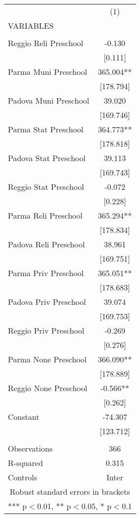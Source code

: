 \begin{tabular}{lc} \hline
 & (1) \\
VARIABLES &  \\ \hline
 &  \\
Reggio Reli Preschool & -0.130 \\
 & [0.111] \\
Parma Muni Preschool & 365.004** \\
 & [178.794] \\
Padova Muni Preschool & 39.020 \\
 & [169.746] \\
Parma Stat Preschool & 364.773** \\
 & [178.818] \\
Padova Stat Preschool & 39.113 \\
 & [169.743] \\
Reggio Stat Preschool & -0.072 \\
 & [0.228] \\
Parma Reli Preschool & 365.294** \\
 & [178.834] \\
Padova Reli Preschool & 38.961 \\
 & [169.751] \\
Parma Priv Preschool & 365.051** \\
 & [178.683] \\
Padova Priv Preschool & 39.074 \\
 & [169.753] \\
Reggio Priv Preschool & -0.269 \\
 & [0.276] \\
Parma None Preschool & 366.090** \\
 & [178.889] \\
Reggio None Preschool & -0.566** \\
 & [0.262] \\
Constant & -74.307 \\
 & [123.712] \\
 &  \\
Observations & 366 \\
R-squared & 0.315 \\
 Controls & Inter \\ \hline
\multicolumn{2}{c}{ Robust standard errors in brackets} \\
\multicolumn{2}{c}{ *** p$<$0.01, ** p$<$0.05, * p$<$0.1} \\
\end{tabular}
